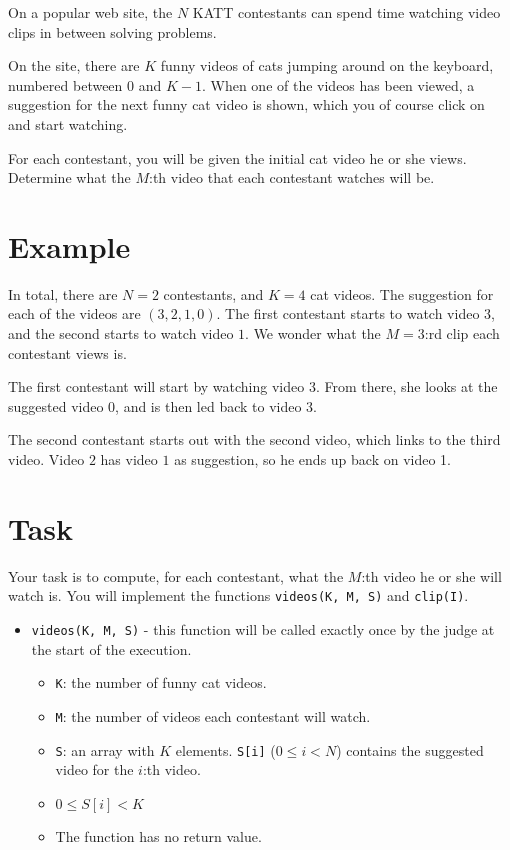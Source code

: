 \newcommand\version{v1}
On a popular web site, the $N$ KATT contestants can spend time watching video clips in between solving problems.

On the site, there are $K$ funny videos of cats jumping around on the keyboard, numbered between $0$ and $K - 1$.
When one of the videos has been viewed, a suggestion for the next funny cat video is shown, which you of course click on and start watching.

For each contestant, you will be given the initial cat video he or she views. Determine what the $M$:th video
that each contestant watches will be.

\section*{Example}
In total, there are $N = 2$ contestants, and $K = 4$ cat videos.
The suggestion for each of the videos are $(3, 2, 1, 0)$. The first contestant starts to watch video $3$, and the second starts to watch video $1$.
We wonder what the $M = 3$:rd clip each contestant views is.

The first contestant will start by watching video 3. From there, she looks at the suggested video 0, and is then led back to video 3.

The second contestant starts out with the second video, which links to the third video. Video $2$ has video $1$ as suggestion, so he ends up back on video 1.

\section*{Task}
Your task is to compute, for each contestant, what the $M$:th video he or she will watch is.
You will implement the functions \texttt{videos(K, M, S)} and \texttt{clip(I)}.

\begin{itemize}
  \item \texttt{videos(K, M, S)} - this function will be called exactly once by the judge at the start of the execution.
  \begin{itemize}
    \item \texttt{K}: the number of funny cat videos.
    \item \texttt{M}: the number of videos each contestant will watch.
    \item \texttt{S}: an array with $K$ elements. \texttt{S[i]} ($0 \le i < N$) contains the suggested video for the $i$:th video.
		\item $0 \le S[i] < K$
		\item The function has no return value.
  \end{itemize}
\end{itemize}

